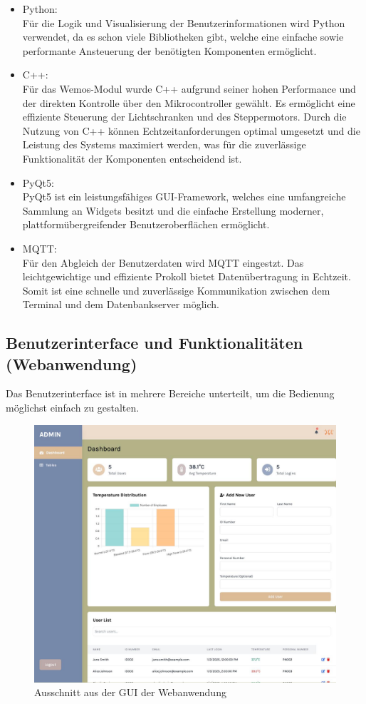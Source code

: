\begin{itemize}
    \item Python:\\
    Für die Logik und Visualisierung der Benutzerinformationen wird Python verwendet, da es schon viele Bibliotheken gibt, welche eine einfache sowie performante Ansteuerung der benötigten Komponenten ermöglicht.
    \item C++:\\
    Für das Wemos-Modul wurde C++ aufgrund seiner hohen Performance und der direkten Kontrolle über den Mikrocontroller gewählt. Es ermöglicht eine effiziente Steuerung der Lichtschranken und des Steppermotors. Durch die Nutzung von C++ können Echtzeitanforderungen optimal umgesetzt und die Leistung des Systems maximiert werden, was für die zuverlässige Funktionalität der Komponenten entscheidend ist.
    \item PyQt5:\\
    PyQt5 ist ein leistungsfähiges GUI-Framework, welches eine umfangreiche Sammlung an Widgets besitzt und die einfache Erstellung moderner, plattformübergreifender Benutzeroberflächen ermöglicht.
    \item MQTT:\\
    Für den Abgleich der Benutzerdaten wird MQTT eingestzt. Das leichtgewichtige und effiziente Prokoll bietet Datenübertragung in Echtzeit. Somit ist eine schnelle und zuverlässige Kommunikation zwischen dem Terminal und dem Datenbankserver möglich. 
\end{itemize}

\subsection{Benutzerinterface und Funktionalitäten (Webanwendung)}

Das Benutzerinterface ist in mehrere Bereiche unterteilt, um die Bedienung möglichst einfach zu gestalten. 

\begin{figure}[h]
	\centering
	\includegraphics[width=0.4\linewidth]{figures/GUI.jpeg}
	\caption[GUI]{Ausschnitt aus der GUI der Webanwendung}\label{fig:gui}
\end{figure}

